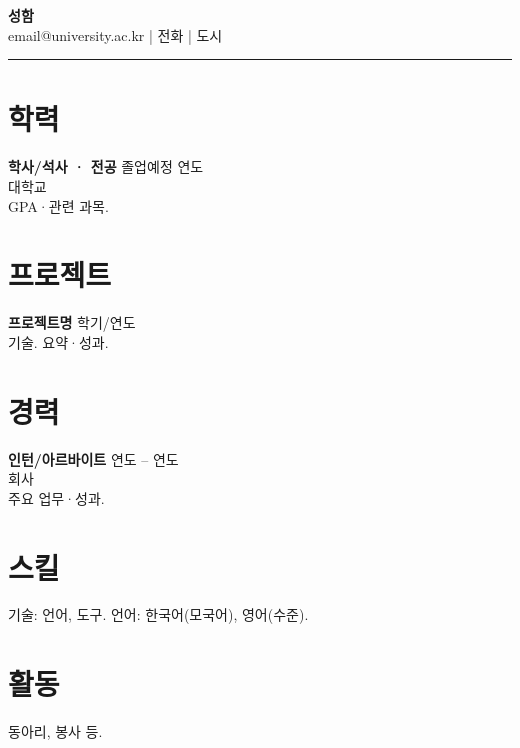 \documentclass[11pt,a4paper]{article}
\begin{document}
\begin{center}
{\LARGE \textbf{성함}}\\[0.2em]
email@university.ac.kr \quad | \quad 전화 \quad | \quad 도시
\end{center}
\begin{flushright}\rule{2cm}{2.5cm}\end{flushright}
\vspace{0.4em}
\section*{학력}
\textbf{학사/석사 · 전공} \hfill 졸업예정 연도 \\
대학교 \\
GPA·관련 과목.
\section*{프로젝트}
\textbf{프로젝트명} \hfill 학기/연도 \\
기술. 요약·성과.
\section*{경력}
\textbf{인턴/아르바이트} \hfill 연도 -- 연도 \\
회사 \\
주요 업무·성과.
\section*{스킬}
기술: 언어, 도구. \quad 언어: 한국어(모국어), 영어(수준).
\section*{활동}
동아리, 봉사 등.
\end{document}
